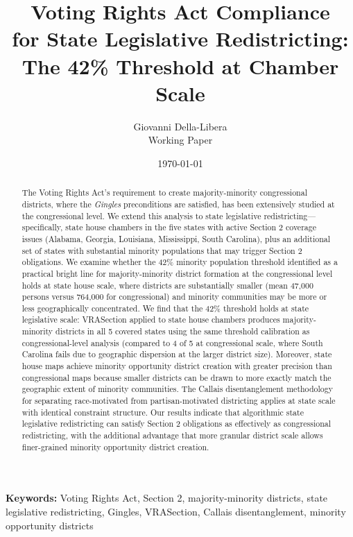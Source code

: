 \documentclass[12pt]{article}
\title{Voting Rights Act Compliance\\
for State Legislative Redistricting:\\
The 42\% Threshold at Chamber Scale}
\author{
Giovanni Della-Libera\\
\small{Working Paper}
}
\date{\today}
\begin{document}
\maketitle

\begin{abstract}
The Voting Rights Act's requirement to create majority-minority congressional districts, where the \textit{Gingles} preconditions are satisfied, has been extensively studied at the congressional level. We extend this analysis to state legislative redistricting---specifically, state house chambers in the five states with active Section 2 coverage issues (Alabama, Georgia, Louisiana, Mississippi, South Carolina), plus an additional set of states with substantial minority populations that may trigger Section 2 obligations. We examine whether the 42\% minority population threshold identified as a practical bright line for majority-minority district formation at the congressional level \citep{dellaLibera2026threshold} holds at state house scale, where districts are substantially smaller (mean 47,000 persons versus 764,000 for congressional) and minority communities may be more or less geographically concentrated. We find that the 42\% threshold holds at state legislative scale: VRASection applied to state house chambers produces majority-minority districts in all 5 covered states using the same threshold calibration as congressional-level analysis (compared to 4 of 5 at congressional scale, where South Carolina fails due to geographic dispersion at the larger district size). Moreover, state house maps achieve minority opportunity district creation with greater precision than congressional maps because smaller districts can be drawn to more exactly match the geographic extent of minority communities. The Callais disentanglement methodology for separating race-motivated from partisan-motivated districting applies at state scale with identical constraint structure. Our results indicate that algorithmic state legislative redistricting can satisfy Section 2 obligations as effectively as congressional redistricting, with the additional advantage that more granular district scale allows finer-grained minority opportunity district creation.
\end{abstract}

\noindent\textbf{Keywords:} Voting Rights Act, Section 2, majority-minority districts, state legislative redistricting, Gingles, VRASection, Callais disentanglement, minority opportunity districts











\end{document}
